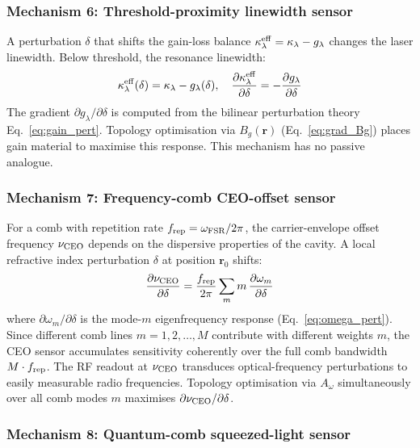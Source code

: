 \documentclass[12pt]{article}
\begin{document}
\subsubsection*{Mechanism 6: Threshold-proximity linewidth sensor}

A perturbation $\delta$ that shifts the gain-loss balance
$\kappa_\lambda^{\rm eff} = \kappa_\lambda - g_\lambda$ changes the
laser linewidth.  Below threshold, the resonance linewidth:
\begin{equation}
  \kappa_\lambda^{\rm eff}(\delta) = \kappa_\lambda - g_\lambda(\delta),\quad
  \frac{\partial\kappa_\lambda^{\rm eff}}{\partial\delta} =
  -\frac{\partial g_\lambda}{\partial\delta}
  \label{eq:thresh_sensor}
\end{equation}
The gradient $\partial g_\lambda/\partial\delta$ is computed from the
bilinear perturbation theory Eq.~\eqref{eq:gain_pert}.  Topology
optimisation via $B_g(\mathbf{r})$ (Eq.~\ref{eq:grad_Bg}) places gain
material to maximise this response.  This mechanism has no passive analogue.

\subsubsection*{Mechanism 7: Frequency-comb CEO-offset sensor}

For a comb with repetition rate $f_{\rm rep} = \omega_{\rm FSR}/2\pi$,
the carrier-envelope offset frequency $\nu_{\rm CEO}$ depends on
the dispersive properties of the cavity.  A local refractive index
perturbation $\delta$ at position $\mathbf{r}_0$ shifts:
\begin{equation}
  \frac{\partial\nu_{\rm CEO}}{\partial\delta} =
  \frac{f_{\rm rep}}{2\pi}\sum_m m\,
  \frac{\partial\omega_m}{\partial\delta}
  \label{eq:CEO_sensitivity}
\end{equation}
where $\partial\omega_m/\partial\delta$ is the mode-$m$ eigenfrequency
response (Eq.~\ref{eq:omega_pert}).  Since different comb lines
$m = 1,2,\ldots,M$ contribute with different weights $m$, the CEO
sensor accumulates sensitivity coherently over the full comb bandwidth
$M\cdot f_{\rm rep}$.  The RF readout at $\nu_{\rm CEO}$ transduces
optical-frequency perturbations to easily measurable radio frequencies.
Topology optimisation via $A_\omega$ simultaneously over all comb modes
$m$ maximises $\partial\nu_{\rm CEO}/\partial\delta$.

\subsubsection*{Mechanism 8: Quantum-comb squeezed-light sensor}
\end{document}
